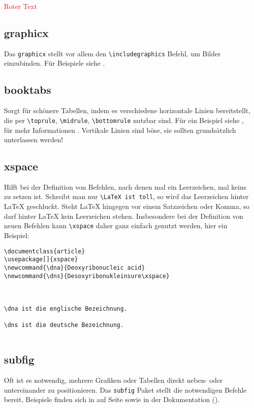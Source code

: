 \textcolor{red}{Roter Text}

\subsection{graphicx}

Das \texttt{graphicx} stellt vor allem den  \verb|\includegraphics| Befehl, um Bilder einzubinden. Für Beispiele siehe . 

\subsection{booktabs}

Sorgt für schönere Tabellen, indem es verschiedene horizontale Linien bereitstellt, die per \verb|\toprule|, \verb|\midrule|, \verb|\bottomrule| nutzbar sind. Für ein Beispiel siehe , für mehr Informationen \cite{booktabs}. Vertikale Linien sind böse, sie sollten grundsätzlich unterlassen werden!

\subsection{xspace}

Hilft bei der Definition von Befehlen, nach denen mal ein Leerzeichen, mal keins zu setzen ist. Schreibt man nur \verb|\LaTeX ist toll|, so wird das Leerzeichen hinter \LaTeX{} geschluckt. Steht \LaTeX{} hingegen vor einem Satzzeichen oder Komma, so darf hinter \LaTeX{} kein Leerzeichen stehen. Insbesondere bei der Definition von neuen Befehlen kann \verb|\xspace| daher ganz einfach genutzt werden, hier ein Beispiel:

\begin{lstlisting}
\documentclass{article}
\usepackage[]{xspace}
\newcommand{\dna}{Deoxyribonucleic acid}
\newcommand{\dns}{Desoxyribonukleinsure\xspace}



\dna ist die englische Bezeichnung.

\dns ist die deutsche Bezeichnung.


\end{lstlisting}

\subsection{subfig}

Oft ist es notwendig, mehrere Grafiken oder Tabellen direkt neben- oder untereinander zu positionieren. Das \texttt{subfig} Paket stellt die notwendigen Befehle bereit, Beispiele finden sich in  auf Seite \pageref{sec:figures} sowie in der Dokumentation (\cite{subfig}).

